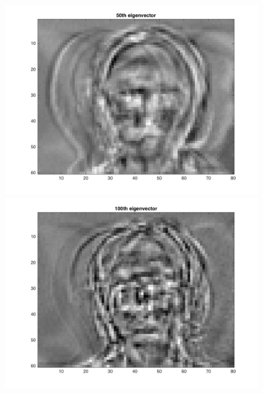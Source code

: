 \documentclass{article}
\begin{document}
\begin{figure}[H]
\includegraphics[scale =.5]{report7_5}
\includegraphics[scale =.5]{report7_6}
\end{figure}
\end{document}

